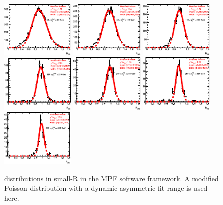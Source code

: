 \begin{figure}[t]
    \includegraphics[width=0.31\textwidth]{plots/insitu/fits_MPF_smallR/mpf_fit_bin7.pdf}
    \includegraphics[width=0.31\textwidth]{plots/insitu/fits_MPF_smallR/mpf_fit_bin8.pdf}
    \includegraphics[width=0.31\textwidth]{plots/insitu/fits_MPF_smallR/mpf_fit_bin9.pdf}
    \includegraphics[width=0.31\textwidth]{plots/insitu/fits_MPF_smallR/mpf_fit_bin10.pdf}
    \includegraphics[width=0.31\textwidth]{plots/insitu/fits_MPF_smallR/mpf_fit_bin11.pdf}
    \includegraphics[width=0.31\textwidth]{plots/insitu/fits_MPF_smallR/mpf_fit_bin12.pdf}
    \includegraphics[width=0.31\textwidth]{plots/insitu/fits_MPF_smallR/mpf_fit_bin13.pdf}
    \caption{\ptbal distributions in small-R \zeejets in the MPF software framework. A modified Poisson distribution with a dynamic asymmetric fit range is used here.\label{fig:insitu:mpfsmallrfits}}
\end{figure}